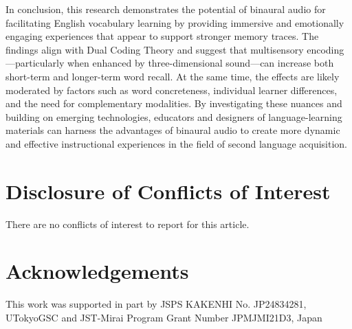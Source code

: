 \documentclass{ehissymp}
\begin{document}
In conclusion, this research demonstrates the potential of binaural audio for facilitating English vocabulary learning by providing immersive and emotionally engaging experiences that appear to support stronger memory traces. The findings align with Dual Coding Theory and suggest that multisensory encoding—particularly when enhanced by three-dimensional sound—can increase both short-term and longer-term word recall. At the same time, the effects are likely moderated by factors such as word concreteness, individual learner differences, and the need for complementary modalities. By investigating these nuances and building on emerging technologies, educators and designers of language-learning materials can harness the advantages of binaural audio to create more dynamic and effective instructional experiences in the field of second language acquisition.

\section*{Disclosure of Conflicts of Interest}
There are no conflicts of interest to report for this article.

\section*{Acknowledgements}
This work was supported in part by JSPS KAKENHI No. JP24834281, UTokyoGSC and JST-Mirai Program Grant Number JPMJMI21D3, Japan



\end{document}
